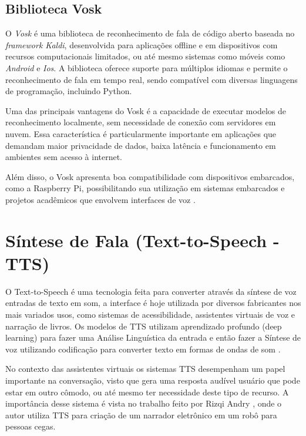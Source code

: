 \subsection{Biblioteca Vosk}

O \textit{Vosk} é uma biblioteca de reconhecimento de fala de código aberto baseada no \textit{framework Kaldi}, desenvolvida para aplicações offline e em dispositivos com recursos computacionais limitados, ou até mesmo sistemas como móveis como \textit{Android} e \textit{Ios}. A biblioteca oferece suporte para múltiplos idiomas e permite o reconhecimento de fala em tempo real, sendo compatível com diversas linguagens de programação, incluindo Python.

Uma das principais vantagens do Vosk é a capacidade de executar modelos de reconhecimento localmente, sem necessidade de conexão com servidores em nuvem. Essa característica é particularmente importante em aplicações que demandam maior privacidade de dados, baixa latência e funcionamento em ambientes sem acesso à internet.

Além disso, o Vosk apresenta boa compatibilidade com dispositivos embarcados, como a Raspberry Pi, possibilitando sua utilização em sistemas embarcados e projetos acadêmicos que envolvem interfaces de voz \cite{vosk}.

\section{Síntese de Fala (Text-to-Speech - TTS)}

O Text-to-Speech é uma tecnologia feita para converter através da síntese de voz entradas de texto em som, a interface é hoje utilizada por diversos fabricantes nos mais variados usos, como sistemas de acessibilidade, assistentes virtuais de voz e narração de livros. Os modelos de TTS utilizam aprendizado profundo (deep learning) para fazer uma Análise Linguística da entrada e então fazer a Síntese de voz utilizando codificação para converter texto em formas de ondas de som \cite{tts_ansi}.

No contexto das assistentes virtuais os sistemas TTS desempenham um papel importante na conversação, visto que gera uma resposta audível usuário que pode estar em outro cômodo, ou até mesmo ter necessidade deste tipo de recurso. A importância desse sistema é vista no trabalho feito por Rizqi Andry \cite{ardiansyah2016narrator}, onde o autor utiliza TTS para criação de um narrador eletrônico em um robô para pessoas cegas.

